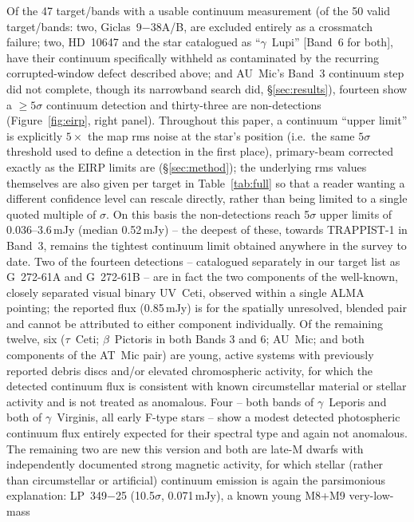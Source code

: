 \documentclass{openjournal}
\begin{document}
Of the 47 target/bands with a usable continuum measurement (of the 50
valid target/bands: two, Giclas~9$-$38A/B, are excluded entirely as a
crossmatch failure; two, HD~10647 and the star catalogued as
``$\gamma$~Lupi'' [Band~6 for both], have their continuum specifically
withheld as contaminated by the recurring corrupted-window defect
described above; and AU~Mic's Band~3 continuum step did not complete,
though its narrowband search did, \S\ref{sec:results}), fourteen show a
$\geq5\sigma$ continuum detection and thirty-three are non-detections
(Figure~\ref{fig:eirp}, right panel). Throughout this paper, a continuum
``upper limit'' is explicitly $5\times$ the map rms noise at the star's
position (i.e.\ the same $5\sigma$ threshold used to define a detection
in the first place), primary-beam corrected exactly as the EIRP limits
are (\S\ref{sec:method}); the underlying rms values themselves are also
given per target in Table~\ref{tab:full} so that a reader wanting a
different confidence level can rescale directly, rather than being
limited to a single quoted multiple of $\sigma$. On this basis the
non-detections reach 5$\sigma$ upper limits of 0.036--3.6\,mJy (median
0.52\,mJy) -- the deepest of these, towards TRAPPIST-1 in Band~3, remains
the tightest continuum limit obtained anywhere in the survey to date.
Two of the fourteen detections -- catalogued separately in our target list
as G~272-61A and G~272-61B -- are in fact the two components of the
well-known, closely separated visual binary UV~Ceti, observed within a
single ALMA pointing; the reported flux (0.85\,mJy) is for the spatially
unresolved, blended pair and cannot be attributed to either component
individually. Of the remaining twelve, six ($\tau$~Ceti; $\beta$~Pictoris in
both Bands 3 and 6; AU~Mic; and both components of the AT~Mic pair) are
young, active systems with previously reported debris discs and/or
elevated chromospheric activity, for which the detected continuum flux
is consistent with known circumstellar material or stellar activity and
is not treated as anomalous. Four -- both bands of
$\gamma$~Leporis and both of $\gamma$~Virginis, all early F-type stars --
show a modest detected photospheric continuum flux entirely expected for
their spectral type and again not anomalous. The remaining two are new
this version and both are late-M dwarfs with independently documented
strong magnetic activity, for which stellar (rather than circumstellar or
artificial) continuum emission is again the parsimonious explanation:
LP~349$-$25 (10.5$\sigma$, 0.071\,mJy), a known young M8+M9 very-low-mass
\end{document}
